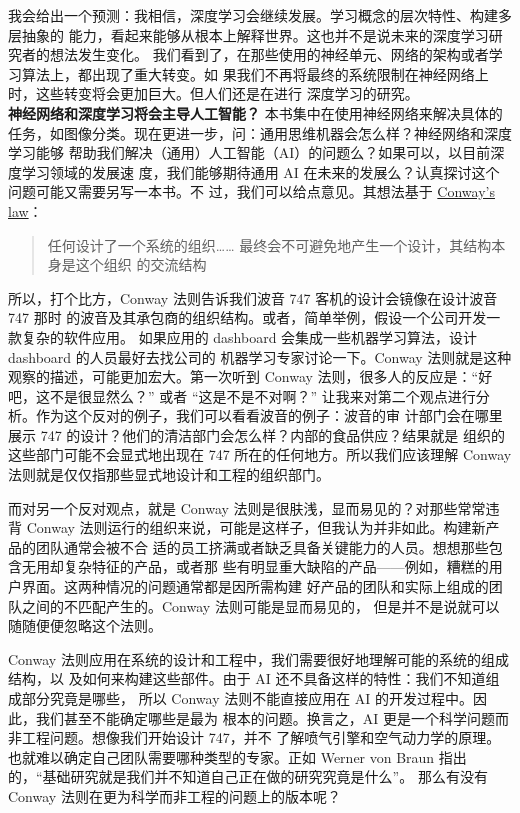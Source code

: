 我会给出一个预测：我相信，深度学习会继续发展。学习概念的层次特性、构建多层抽象的
能力，看起来能够从根本上解释世界。这也并不是说未来的深度学习研究者的想法发生变化。
我们看到了，在那些使用的神经单元、网络的架构或者学习算法上，都出现了重大转变。如
果我们不再将最终的系统限制在神经网络上时，这些转变将会更加巨大。但人们还是在进行
深度学习的研究。\\

\textbf{神经网络和深度学习将会主导人工智能？} 本书集中在使用神经网络来解决具体的
任务，如图像分类。现在更进一步，问：通用思维机器会怎么样？神经网络和深度学习能够
帮助我们解决（通用）人工智能（AI）的问题么？如果可以，以目前深度学习领域的发展速
度，我们能够期待通用 AI 在未来的发展么？认真探讨这个问题可能又需要另写一本书。不
过，我们可以给点意见。其想法基于
\href{http://en.wikipedia.org/wiki/Conway%27s_law}{Conway's law}：

\begin{quote}
任何设计了一个系统的组织…… 最终会不可避免地产生一个设计，其结构本身是这个组织
的交流结构
\end{quote}

所以，打个比方，Conway 法则告诉我们波音 747 客机的设计会镜像在设计波音 747 那时
的波音及其承包商的组织结构。或者，简单举例，假设一个公司开发一款复杂的软件应用。
如果应用的 dashboard 会集成一些机器学习算法，设计 dashboard 的人员最好去找公司的
机器学习专家讨论一下。Conway 法则就是这种观察的描述，可能更加宏大。第一次听到
Conway 法则，很多人的反应是：“好吧，这不是很显然么？” 或者 “这是不是不对啊？”
让我来对第二个观点进行分析。作为这个反对的例子，我们可以看看波音的例子：波音的审
计部门会在哪里展示 747 的设计？他们的清洁部门会怎么样？内部的食品供应？结果就是
组织的这些部门可能不会显式地出现在 747 所在的任何地方。所以我们应该理解 Conway
法则就是仅仅指那些显式地设计和工程的组织部门。

而对另一个反对观点，就是 Conway 法则是很肤浅，显而易见的？对那些常常违背 Conway
法则运行的组织来说，可能是这样子，但我认为并非如此。构建新产品的团队通常会被不合
适的员工挤满或者缺乏具备关键能力的人员。想想那些包含无用却复杂特征的产品，或者那
些有明显重大缺陷的产品——例如，糟糕的用户界面。这两种情况的问题通常都是因所需构建
好产品的团队和实际上组成的团队之间的不匹配产生的。Conway 法则可能是显而易见的，
但是并不是说就可以随随便便忽略这个法则。

Conway 法则应用在系统的设计和工程中，我们需要很好地理解可能的系统的组成结构，以
及如何来构建这些部件。由于 AI 还不具备这样的特性：我们不知道组成部分究竟是哪些，
所以 Conway 法则不能直接应用在 AI 的开发过程中。因此，我们甚至不能确定哪些是最为
根本的问题。换言之，AI 更是一个科学问题而非工程问题。想像我们开始设计 747，并不
了解喷气引擎和空气动力学的原理。也就难以确定自己团队需要哪种类型的专家。正如
Werner von Braun 指出的，“基础研究就是我们并不知道自己正在做的研究究竟是什么”。
那么有没有 Conway 法则在更为科学而非工程的问题上的版本呢？

